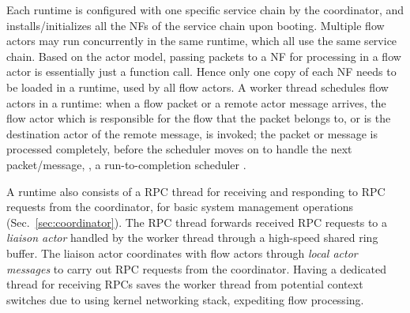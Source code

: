 Each runtime is configured with one specific service chain by the coordinator, and installs/initializes all the NFs of the service chain upon booting. Multiple flow actors may run concurrently in the same runtime, which all use the same service chain.  %
 Based on the actor model, passing packets to a NF for processing in a flow actor is essentially just a function call. Hence only one copy of each NF needs to be loaded in a runtime, used by all flow actors.
 A worker thread schedules flow actors in a runtime: %
  when a flow packet or a remote actor message arrives, the flow actor which is responsible for the flow that the packet belongs to, or is the destination actor of the remote message, is invoked; the packet or message is processed completely, before the scheduler moves on to handle the next packet/message, \ie, a run-to-completion scheduler \cite{199352}. %


A runtime also consists of a RPC thread for receiving and responding to RPC requests from the coordinator, for basic system management operations (Sec.~\ref{sec:coordinator}). The RPC thread forwards received RPC requests to a {\em liaison actor} handled by the worker thread through a high-speed shared ring buffer.  The liaison actor coordinates with flow actors through {\em local actor messages} to carry out RPC requests from the coordinator. Having a dedicated thread for receiving RPCs saves the worker thread from potential context switches due to using kernel networking stack, expediting flow processing.

